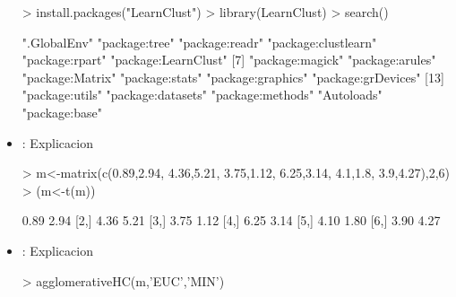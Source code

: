 \documentclass[a4paper, 12pt]{article}
\begin{document}
	\begin{itemize}
\begin{Schunk}
\begin{Sinput}
> install.packages("LearnClust")
> library(LearnClust)
> search()
\end{Sinput}
\begin{Soutput}
 [1] ".GlobalEnv"         "package:tree"       "package:readr"      "package:clustlearn" "package:rpart"      "package:LearnClust"
 [7] "package:magick"     "package:arules"     "package:Matrix"     "package:stats"      "package:graphics"   "package:grDevices" 
[13] "package:utils"      "package:datasets"   "package:methods"    "Autoloads"          "package:base"      
\end{Soutput}
\end{Schunk}
		\item \texttt{}: 
		Explicacion
\begin{Schunk}
\begin{Sinput}
> m<-matrix(c(0.89,2.94, 4.36,5.21, 3.75,1.12, 6.25,3.14, 4.1,1.8, 3.9,4.27),2,6)
> (m<-t(m))
\end{Sinput}
\begin{Soutput}
     [,1] [,2]
[1,] 0.89 2.94
[2,] 4.36 5.21
[3,] 3.75 1.12
[4,] 6.25 3.14
[5,] 4.10 1.80
[6,] 3.90 4.27
\end{Soutput}
\end{Schunk}
		\item \texttt{}: 
		Explicacion
\begin{Schunk}
\begin{Sinput}
> agglomerativeHC(m,'EUC','MIN')
\end{Sinput}
\end{Schunk}
\end{itemize}
\end{document}
